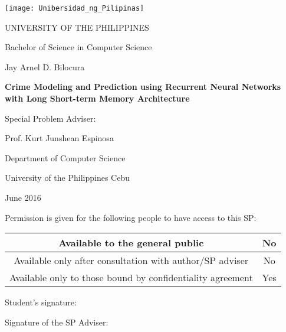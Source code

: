 \begin{permission}
    \texttt{[image: Unibersidad\_ng\_Pilipinas]}
    \par\MakeUppercase{University of the Philippines}
    \par Bachelor of Science in Computer Science
    \vspace{1cm}
    \par Jay Arnel D. Bilocura
    \vspace{1cm}
    \par\textbf{Crime Modeling and Prediction using Recurrent Neural Networks with Long Short-term Memory Architecture}
    \vspace{1cm}
    \par Special Problem Adviser:
    \par Prof. Kurt Junshean Espinosa
    \vspace{1cm}
    \par Department of Computer Science
    \par University of the Philippines Cebu
    \vspace{1cm}
    \par June 2016
    \vspace{1cm}
    \par Permission is given for the following people to have access to this SP:
    \begin{table}[H]
      \centering
      \begin{tabular}{|c|c|}
          \hline
          Available to the general public &No \\
          \hline
          Available only after consultation with author/SP adviser &No \\
          \hline
          Available only to those bound by confidentiality agreement &Yes \\
          \hline
        \end{tabular}
    \end{table}
    \par Student's signature: \hspace{3cm}
    \par Signature of the SP Adviser: \hspace{4cm}
\end{permission}